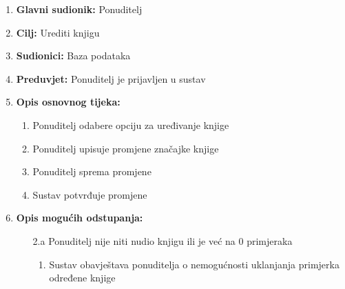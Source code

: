 \noindent {}
\begin{enumerate}
	
	\item \textbf{Glavni sudionik: } Ponuditelj
	\item  \textbf{Cilj:} Urediti knjigu
	\item  \textbf{Sudionici:} Baza podataka
	\item  \textbf{Preduvjet:} Ponuditelj je prijavljen u sustav
	\item  \textbf{Opis osnovnog tijeka:}
	
	\begin{enumerate}
		
		\item Ponuditelj odabere opciju za uređivanje knjige
		\item Ponuditelj upisuje promjene značajke knjige 
		\item Ponuditelj sprema promjene
		\item Sustav potvrđuje promjene
		
	\end{enumerate}
	
	\item  \textbf{Opis mogućih odstupanja:}
	
	\item[] \begin{enumerate}
		
		\item[2.a] Ponuditelj nije niti nudio knjigu ili je već na 0 primjeraka 
		\item[] \begin{enumerate}
			
			\item Sustav obavještava ponuditelja o nemogućnosti uklanjanja primjerka određene knjige
			
		\end{enumerate}
		
	\end{enumerate}
	
\end{enumerate}

